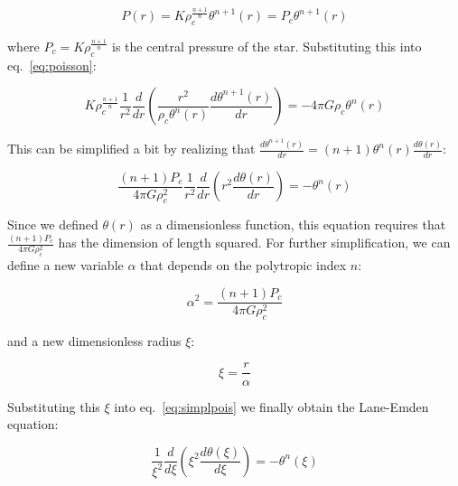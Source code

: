 \documentclass[twoside]{article}
\begin{document}
            \[
                P(r)=K\rho_c^{\frac{n+1}{n}}\theta^{n+1}(r)=P_c\theta^{n+1}(r)
            \]

            where \(P_c=K\rho_c^{\frac{n+1}{n}}\) is the central pressure of the
            star. Substituting this into eq.~\ref{eq:poisson}:

            \[
                K\rho_c^{\frac{n+1}{n}}\frac{1}{r^2}\frac{d}{dr}\left(\frac{r^2}{\rho_c\theta^n(r)}\frac{d\theta^{n+1}(r)}{dr}\right)=-4\pi
                G\rho_c\theta^n(r)
            \]

            This can be simplified a bit by realizing that
            \(\frac{d\theta^{n+1}(r)}{dr}=(n+1)\theta^n(r)\frac{d\theta(r)}{dr}\):

            \begin{equation}
                \label{eq:simplpois}
                \frac{(n+1)P_c}{4\pi
                G\rho_c^2}\frac{1}{r^2}\frac{d}{dr}\left(r^2\frac{d\theta(r)}{dr}\right)=-\theta^n(r)
            \end{equation}

            Since we defined \(\theta(r)\) as a dimensionless function, this
            equation requires that \(\frac{(n+1)P_c}{4\pi G\rho_c^2}\) has the
            dimension of length squared. For further simplification, we can
            define a new variable \(\alpha\) that depends on the polytropic
            index \(n\):

            \begin{equation}
                \label{eq:alpha}
                \alpha^2=\frac{(n+1)P_c}{4\pi G\rho_c^2}
            \end{equation}

            and a new dimensionless radius \(\xi\):

            \begin{equation}
                \label{eq:xi}
                \xi=\frac{r}{\alpha}
            \end{equation}

            Substituting this \(\xi\) into eq.~\ref{eq:simplpois} we finally
            obtain the Lane-Emden equation:

            \begin{equation}
                \frac{1}{\xi^2}\frac{d}{d\xi}\left(\xi^2\frac{d\theta(\xi)}{d\xi}\right)=-\theta^n(\xi)
            \end{equation}
\end{document}
